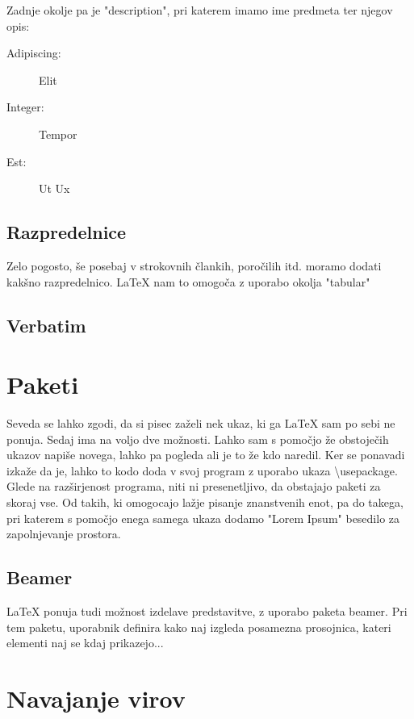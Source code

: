 \documentclass[10p, a4paper, twopage]{book}
\begin{document}
Zadnje okolje pa je "description", pri katerem imamo ime predmeta ter njegov opis:
\begin{description}
\item[Adipiscing:] Elit
\item[Integer:] Tempor
\item[Est:] Ut Ux
\end{description}

\subsection{Razpredelnice}

Zelo pogosto, še posebaj v strokovnih člankih, poročilih itd. moramo dodati kakšno razpredelnico. \LaTeX{} nam to omogoča z uporabo okolja "tabular"

\subsection{Verbatim}


\section{Paketi}
Seveda se lahko zgodi, da si pisec zaželi nek ukaz, ki ga \LaTeX{} sam po sebi ne ponuja. Sedaj ima na voljo dve možnosti. Lahko sam s pomočjo že obstoječih ukazov napiše novega, lahko pa pogleda ali je to že kdo naredil. Ker se ponavadi izkaže da je, lahko to kodo doda v svoj program z uporabo ukaza \textbackslash{}usepackage. Glede na razširjenost programa, niti ni presenetljivo, da obstajajo paketi za skoraj vse. Od takih, ki omogocajo lažje pisanje znanstvenih enot, pa do takega, pri katerem s pomočjo enega samega ukaza dodamo "Lorem Ipsum" besedilo za zapolnjevanje prostora.

\subsection{Beamer}
\LaTeX{} ponuja tudi možnost izdelave predstavitve, z uporabo paketa beamer. Pri tem paketu, uporabnik definira kako naj izgleda posamezna prosojnica, kateri elementi naj se kdaj prikazejo...


\section{Navajanje virov}
\end{document}
